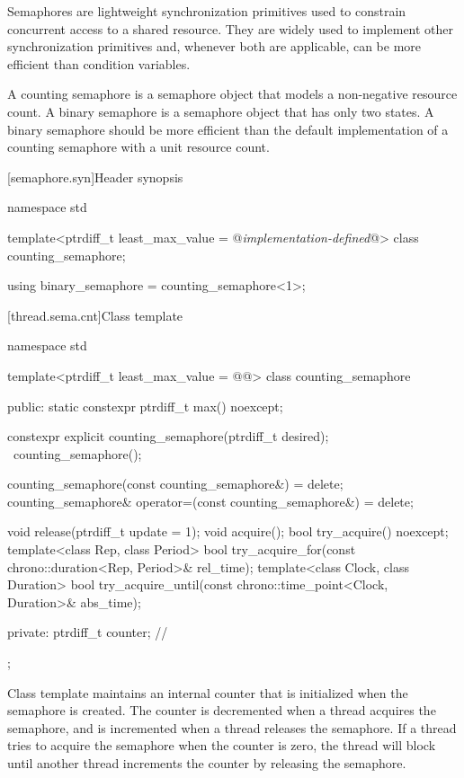 \pnum
Semaphores are lightweight synchronization primitives
used to constrain concurrent access to a shared resource.
They are widely used to implement other synchronization primitives and,
whenever both are applicable, can be more efficient than condition variables.

\pnum
A counting semaphore is a semaphore object
that models a non-negative resource count.
A binary semaphore is a semaphore object that has only two states.
A binary semaphore should be more efficient than
the default implementation of a counting semaphore with a unit resource count.

[semaphore.syn]{Header  synopsis}

%
\begin{codeblock}
namespace std {
  template<ptrdiff_t least_max_value = @\textrm{\textit{implementation-defined}}@>
    class counting_semaphore;

  using binary_semaphore = counting_semaphore<1>;
}
\end{codeblock}

[thread.sema.cnt]{Class template }

\begin{codeblock}
namespace std {
  template<ptrdiff_t least_max_value = @\textrm{\textit{}}@>
  class counting_semaphore {
  public:
    static constexpr ptrdiff_t max() noexcept;

    constexpr explicit counting_semaphore(ptrdiff_t desired);
    ~counting_semaphore();

    counting_semaphore(const counting_semaphore&) = delete;
    counting_semaphore& operator=(const counting_semaphore&) = delete;

    void release(ptrdiff_t update = 1);
    void acquire();
    bool try_acquire() noexcept;
    template<class Rep, class Period>
      bool try_acquire_for(const chrono::duration<Rep, Period>& rel_time);
    template<class Clock, class Duration>
      bool try_acquire_until(const chrono::time_point<Clock, Duration>& abs_time);

  private:
    ptrdiff_t counter;          // \expos
  };
}
\end{codeblock}

\pnum
{}%
Class template  maintains an internal counter
that is initialized when the semaphore is created.
The counter is decremented when a thread acquires the semaphore, and
is incremented when a thread releases the semaphore.
If a thread tries to acquire the semaphore when the counter is zero,
the thread will block
until another thread increments the counter by releasing the semaphore.

